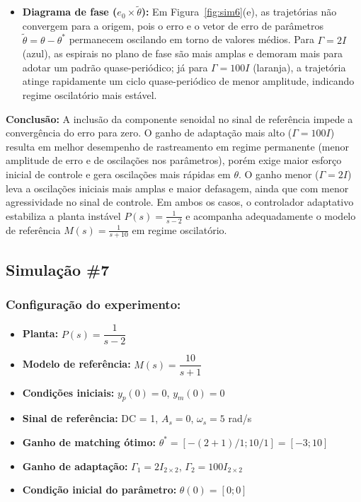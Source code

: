 \documentclass[10pt]{article}
\begin{document}
\begin{itemize}
    \item \textbf{Diagrama de fase ($e_0 \times \tilde{\theta}$):} Em Figura~\ref{fig:sim6}(e), as trajetórias não convergem para a origem, pois o erro e o vetor de erro de parâmetros $\tilde{\theta} = \theta - \theta^*$ permanecem oscilando em torno de valores médios. Para $\Gamma = 2I$ (azul), as espirais no plano de fase são mais amplas e demoram mais para adotar um padrão quase-periódico; já para $\Gamma = 100I$ (laranja), a trajetória atinge rapidamente um ciclo quase-periódico de menor amplitude, indicando regime oscilatório mais estável.
\end{itemize}

\textbf{Conclusão:} A inclusão da componente senoidal no sinal de referência impede a convergência do erro para zero. O ganho de adaptação mais alto ($\Gamma = 100I$) resulta em melhor desempenho de rastreamento em regime permanente (menor amplitude de erro e de oscilações nos parâmetros), porém exige maior esforço inicial de controle e gera oscilações mais rápidas em $\theta$. O ganho menor ($\Gamma = 2I$) leva a oscilações iniciais mais amplas e maior defasagem, ainda que com menor agressividade no sinal de controle. Em ambos os casos, o controlador adaptativo estabiliza a planta instável $P(s)=\frac{1}{s-2}$ e acompanha adequadamente o modelo de referência $M(s)=\frac{1}{s+10}$ em regime oscilatório.

\newpage

\subsection{Simulação \#7}
\subsubsection{Configuração do experimento:}
\begin{itemize}
\item \textbf{Planta:} $P(s) = \dfrac{1}{s - 2}$
\item \textbf{Modelo de referência:} $M(s) = \dfrac{10}{s + 1}$
\item \textbf{Condições iniciais:} $y_p(0)=0$, $y_m(0)=0$
\item \textbf{Sinal de referência:} DC = 1, $A_s=0$, $\omega_s=5$ rad/s
\item \textbf{Ganho de matching ótimo:} $\theta^* = [-(2+1)/1;10/1] = [-3;10]$
\item \textbf{Ganho de adaptação:} $\Gamma_1 = 2I_{2\times2}$, $\Gamma_2 = 100I_{2\times2}$
\item \textbf{Condição inicial do parâmetro:} $\theta(0) = [0;0]$
\end{itemize}
\end{document}
